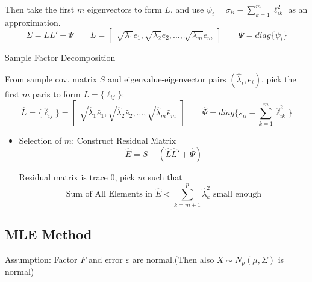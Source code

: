     Then take the first $ m $ eigenvectors to form $ L $, and use $ \psi _i=\sigma  _{ii}-\sum\limits_{k=1}^m\ell_{ik}^2$ as an approximation.
    \begin{equation}
        \Sigma =LL'+\Psi \qquad L=\begin{bmatrix}
            \sqrt{\lambda_1 }e_1,\sqrt{\lambda_2 }e_2,\ldots,\sqrt{\lambda _m}e_m
        \end{bmatrix} \qquad \Psi =diag\{\psi _{i}\}
    \end{equation}

    \begin{point}
        Sample Factor Decomposition
    \end{point}

    From sample cov. matrix $ S $ and eigenvalue-eigenvector pairs $ (\hat{\lambda }_i,e_i) $, pick the first $ m $ paris to form $ L=\{\ell_{ij}\} $:
    \begin{equation}
        \hat{L}=\{\hat{\ell}_{ij}\}=\begin{bmatrix}
            \sqrt{\hat{\lambda }_1}\hat{e}_1,\sqrt{\hat{\lambda }_2}\hat{e}_2,\ldots,\sqrt{\hat{\lambda }_m}\hat{e}_m
        \end{bmatrix} 
        \qquad
        \hat{\Psi }=diag\{s_{ii}-\sum_{k=1}^m\hat{\ell}_{ik}^2\}
    \end{equation}

    \begin{itemize}[topsep=2pt,itemsep=2pt]
        \item Selection of $ m $: Construct Residual Matrix
        \begin{equation}
            \hat{E}=S-(\hat{L}\hat{L}'+\hat{\Psi }) 
        \end{equation}
        
        Residual matrix is trace $ 0 $, pick $ m $ such that
        \begin{equation}
            \text{Sum of All Elements in }\hat{E}<\sum_{k=m+1}^p\hat{\lambda }_{k}^2\text{ small enough} 
        \end{equation}
        
        
        
    \end{itemize}
    
        
    
    
    
    
    
\subsection{MLE Method}
    Assumption: Factor $ F $ and error $ \varepsilon  $ are normal.(Then also $ X \sim N_p(\mu ,\Sigma )$ is normal)
    
